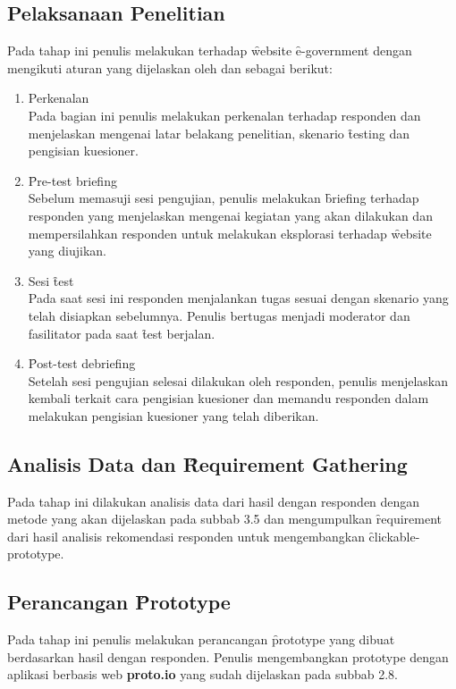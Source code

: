 \subsection{Pelaksanaan Penelitian}
Pada tahap ini penulis melakukan \ust \space terhadap \f{website} \f{e-government} dengan mengikuti aturan yang dijelaskan oleh \citet{buku.rubin} dan \citet{buku.dumas} sebagai berikut:
\begin{enumerate}
	\item Perkenalan\\
	Pada bagian ini penulis melakukan perkenalan terhadap responden dan menjelaskan mengenai latar belakang penelitian, skenario \f{testing} dan pengisian kuesioner.
	\item \f{Pre-test briefing}\\
	Sebelum memasuji sesi pengujian, penulis melakukan \f{briefing} terhadap responden yang menjelaskan mengenai kegiatan yang akan dilakukan dan mempersilahkan responden untuk melakukan eksplorasi terhadap \f{website} yang diujikan.
	\item Sesi \f{test}\\
	Pada saat sesi ini responden menjalankan tugas sesuai dengan skenario yang telah disiapkan sebelumnya. Penulis bertugas menjadi moderator dan fasilitator pada saat \f{test} berjalan.
	\item \f{Post-test debriefing}\\
	Setelah sesi pengujian selesai dilakukan oleh responden, penulis menjelaskan kembali terkait cara pengisian kuesioner dan memandu responden dalam melakukan pengisian kuesioner yang telah diberikan.
\end{enumerate}
\subsection{Analisis Data dan \f{Requirement Gathering}}
Pada tahap ini dilakukan analisis data dari hasil \ust \space dengan responden  dengan metode yang akan dijelaskan pada subbab 3.5 dan mengumpulkan \f{requirement} dari hasil analisis rekomendasi responden untuk mengembangkan \f{clickable-prototype}. 
\subsection{Perancangan \f{Prototype}}
Pada tahap ini penulis melakukan perancangan \f{prototype} yang dibuat berdasarkan hasil \ust \space dengan responden. Penulis mengembangkan prototype dengan aplikasi berbasis web \textbf{proto.io} yang sudah dijelaskan pada subbab 2.8. 
